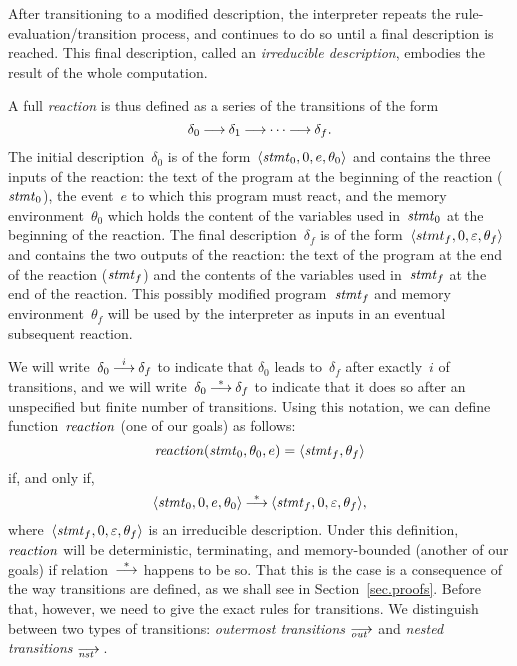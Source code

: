 After transitioning to a modified description, the interpreter repeats the
rule-evaluation/transition process, and continues to do so until a final
description is reached.  This final description, called an \emph{irreducible
  description}, embodies the result of the whole computation.

A full \emph{reaction} is thus defined as a series of the transitions of the
form
\[
  \delta_0\trans\delta_1\trans\cdots\trans\delta_f.
\]
The initial description~$\delta_0$ is of the form~$\<\stmt_0,0,e,\theta_0>$
and contains the three inputs of the reaction: the text of the program at
the beginning of the reaction ($\mathit{stmt}_0$), the event~$e$ to which this
program must react, and the memory environment~$\theta_0$ which holds the
content of the variables used in~$\mathit{stmt}_0$ at the beginning of the reaction.
The final description~$\delta_f$ is of the form~$\<stmt_f,0,\nil,\theta_f>$
and contains the two outputs of the reaction: the text of the program at the
end of the reaction ($\mathit{stmt}_f$) and the contents of the variables used
in~$\mathit{stmt}_f$ at the end of the reaction.  This possibly modified
program~$\mathit{stmt}_f$ and memory environment~$\theta_f$ will be used by the
interpreter as inputs in an eventual subsequent reaction.

We will write~$\delta_0\trans[i]\delta_f$ to indicate that $\delta_0$ leads
to~$\delta_f$ after exactly~$i$ of transitions, and we will
write~$\delta_0\trans[*]\delta_f$ to indicate that it does so after an
unspecified but finite number of transitions.  Using this notation, we can
define function~$\mathop{\mathit{reaction}}$ (one of our goals) as follows:
\[
  \reaction(\stmt_0,\theta_0,e)=\<\stmt_f,\theta_f>
\]
if, and only if,
\[
  \<\stmt_0,0,e,\theta_0>\trans[*]\<\stmt_f,0,\nil,\theta_f>,
\]
where~$\<\stmt_f,0,\nil,\theta_f>$ is an irreducible description.  Under
this definition, $\mathop{\mathit{reaction}}$ will be deterministic, terminating, and
memory-bounded (another of our goals) if relation~$\trans[*]$ happens to be
so.  That this is the case is a consequence of the way transitions are
defined, as we shall see in Section~\ref{sec.proofs}.  Before that, however,
we need to give the exact rules for transitions.  We distinguish between two
types of transitions: \emph{outermost transitions} $\out$ and \emph{nested
  transitions} $\nst$\,.

\strut{}


